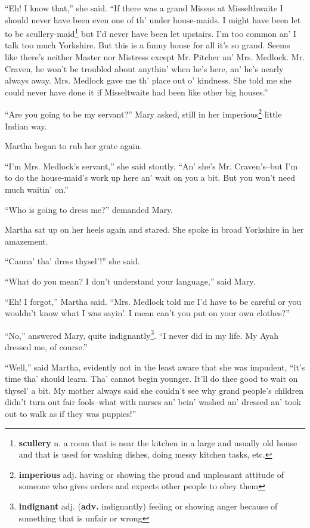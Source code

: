 ``Eh! I know that,'' she said. ``If there was a grand Missus at Misselthwaite I should never have been even one of th' under house-maids. I might have been let to be scullery-maid\footnote{\textbf{scullery} n. a room that is near the kitchen in a large and usually old house and that is used for washing dishes, doing messy kitchen tasks, etc.} but I'd never have been let upstairs. I'm too common an' I talk too much Yorkshire. But this is a funny house for all it's so grand. Seems like there's neither Master nor Mistress except Mr. Pitcher an' Mrs. Medlock. Mr. Craven, he won't be troubled about anythin' when he's here, an' he's nearly always away. Mrs. Medlock gave me th' place out o' kindness. She told me she could never have done it if Misseltwaite had been like other big houses.''

``Are you going to be my servant?'' Mary asked, still in her imperious\footnote{\textbf{imperious} adj. having or showing the proud and unpleasant attitude of someone who gives orders and expects other people to obey them} little Indian way.

Martha began to rub her grate again.

``I'm Mrs. Medlock's servant,'' she said stoutly. ``An' she's Mr. Craven's--but I'm to do the house-maid's work up here an' wait on you a bit. But you won't need much waitin' on.''

``Who is going to dress me?'' demanded Mary.

Martha sat up on her heels again and stared. She spoke in broad Yorkshire in her amazement.

``Canna' tha' dress thysel'!'' she said.

``What do you mean? I don't understand your language,'' said Mary.

``Eh! I forgot,'' Martha said. ``Mrs. Medlock told me I'd have to be careful or you wouldn't know what I was sayin'. I mean can't you put on your own clothes?''

``No,'' answered Mary, quite indignantly\footnote{\textbf{indignant} adj. (\textbf{adv.} indignantly) feeling or showing anger because of something that is unfair or wrong}. ``I never did in my life. My Ayah dressed me, of course.''

``Well,'' said Martha, evidently not in the least aware that she was impudent, ``it's time tha' should learn. Tha' cannot begin younger. It'll do thee good to wait on thysel' a bit. My mother always said she couldn't see why grand people's children didn't turn out fair fools--what with nurses an' bein' washed an' dressed an' took out to walk as if they was puppies!''

